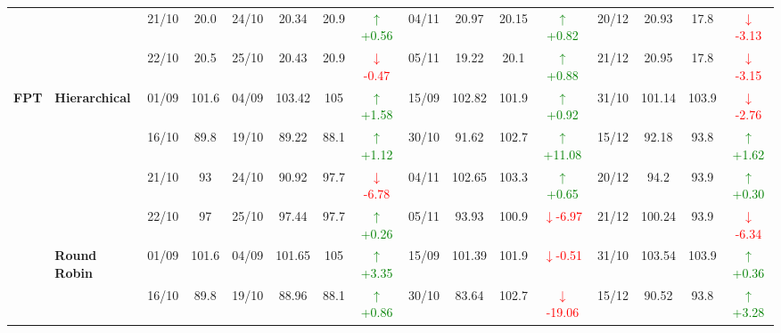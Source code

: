 {\begin{longtable}{llcc|cccc|cccc|cccc}
&
& 21/10 & 20.0 & 24/10 & 20.34 & 20.9 & \textcolor{green}{\(\uparrow\)+0.56} & 04/11 & 20.97 & 20.15 & \textcolor{green}{\(\uparrow\)+0.82} & 20/12 & 20.93 & 17.8 & \textcolor{red}{\(\downarrow\)-3.13} \\

&
& 22/10 & 20.5 & 25/10 & 20.43 & 20.9 & \textcolor{red}{\(\downarrow\)-0.47} & 05/11 & 19.22 & 20.1 & \textcolor{green}{\(\uparrow\)+0.88} & 21/12 & 20.95 & 17.8 & \textcolor{red}{\(\downarrow\)-3.15} \\
\midrule



\multirow{12}{*}{\textbf{FPT}} 
& \textbf{Hierarchical}
& 01/09 & 101.6 & 04/09 & 103.42 & 105 & \textcolor{green}{\(\uparrow\)+1.58} & 15/09 & 102.82 & 101.9 & \textcolor{green}{\(\uparrow\)+0.92} & 31/10 & 101.14 & 103.9 & \textcolor{red}{\(\downarrow\)-2.76} \\

&
& 16/10 & 89.8 & 19/10 & 89.22 & 88.1 & \textcolor{green}{\(\uparrow\)+1.12} & 30/10 & 91.62 & 102.7 & \textcolor{green}{\(\uparrow\)+11.08} & 15/12 & 92.18 & 93.8 & \textcolor{green}{\(\uparrow\)+1.62} \\

&
& 21/10 & 93 & 24/10 & 90.92 & 97.7 & \textcolor{red}{\(\downarrow\)-6.78} & 04/11 & 102.65 & 103.3 & \textcolor{green}{\(\uparrow\)+0.65} & 20/12 & 94.2 & 93.9 & \textcolor{green}{\(\uparrow\)+0.30} \\

&
& 22/10 & 97 & 25/10 & 97.44 & 97.7 & \textcolor{green}{\(\uparrow\)+0.26} & 05/11 & 93.93 & 100.9 & \textcolor{red}{\(\downarrow\)-6.97} & 21/12 & 100.24 & 93.9 & \textcolor{red}{\(\downarrow\)-6.34} \\
\cmidrule(lr){2-16}


& \textbf{Round Robin}
& 01/09 & 101.6 & 04/09 & 101.65 & 105 & \textcolor{green}{\(\uparrow\)+3.35} & 15/09 & 101.39 & 101.9 & \textcolor{red}{\(\downarrow\)-0.51} & 31/10 & 103.54 & 103.9 & \textcolor{green}{\(\uparrow\)+0.36} \\

&
& 16/10 & 89.8 & 19/10 & 88.96 & 88.1 & \textcolor{green}{\(\uparrow\)+0.86} & 30/10 & 83.64 & 102.7 & \textcolor{red}{\(\downarrow\)-19.06} & 15/12 & 90.52 & 93.8 & \textcolor{green}{\(\uparrow\)+3.28} \\


\end{longtable}}
